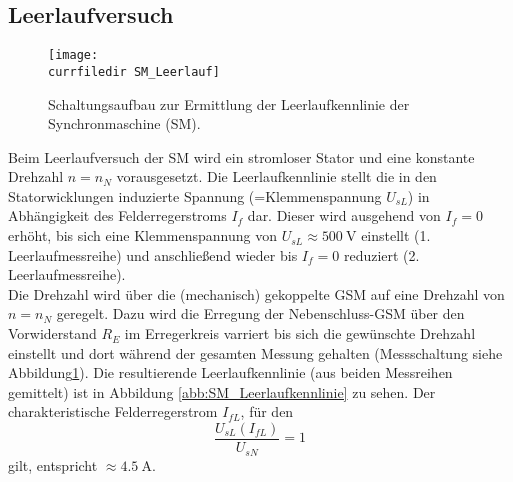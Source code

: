 \subsection{Leerlaufversuch}
\label{subsec:leerlauf}
\begin{figure}
    \centering
    \texttt{[image: \\currfiledir SM\_Leerlauf]}
    \caption{Schaltungsaufbau zur Ermittlung der Leerlaufkennlinie der Synchronmaschine (SM).}
    \label{fig:SM_Leerlauf}
\end{figure}
Beim Leerlaufversuch der SM wird ein stromloser Stator und eine konstante Drehzahl $n=n_N$ vorausgesetzt. Die Leerlaufkennlinie stellt die in den Statorwicklungen induzierte Spannung (=Klemmenspannung $U_{sL}$) in Abhängigkeit des Felderregerstroms $I_f$ dar. Dieser wird ausgehend von $I_f=0$ erhöht, bis sich eine Klemmenspannung von $U_{sL}\approx\SI{500}{\volt}$ einstellt (1. Leerlaufmessreihe) und anschließend wieder bis $I_f=0$ reduziert (2. Leerlaufmessreihe).\\
Die Drehzahl wird über die (mechanisch) gekoppelte GSM auf eine Drehzahl von $n=n_N$ geregelt. Dazu wird die Erregung der Nebenschluss-GSM über den Vorwiderstand $R_E$ im Erregerkreis varriert bis sich die gewünschte Drehzahl einstellt und dort während der gesamten Messung gehalten (Messschaltung siehe Abbildung\;\ref{fig:SM_Leerlauf}). Die resultierende Leerlaufkennlinie (aus beiden Messreihen gemittelt) ist in Abbildung \ref{abb:SM_Leerlaufkennlinie} zu sehen. Der charakteristische Felderregerstrom $I_{fL}$, für den
\begin{equation*}
    \frac{U_{sL}(I_{fL})}{U_{sN}} = 1 
\end{equation*}
gilt, entspricht $\approx\SI{4.5}{\ampere}$.

